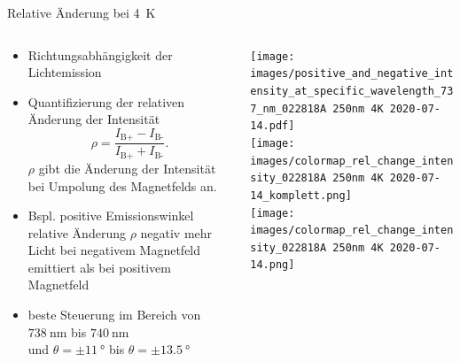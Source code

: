 
\begin{frame}{Relative Änderung bei \SI{4}{\kelvin}}
    \begin{columns}
        \pause
        \begin{column}{0.5\textwidth}
            \begin{itemize}
                \item <2-> Richtungsabhängigkeit der Lichtemission
                \item <3-> Quantifizierung der relativen Änderung der Intensität
                \begin{equation*}
                    \rho = \frac{I_\text{B+} - I_\text{B-} }{ I_\text{B+} + I_\text{B-} }.
                \end{equation*}
                $\rho$ gibt die Änderung der Intensität bei Umpolung des Magnetfelds an.
                \item <6-> Bspl. positive Emissionswinkel \rightarrow relative Änderung $\rho$ negativ 
                \rightarrow mehr Licht bei negativem Magnetfeld emittiert als bei positivem Magnetfeld
                \item <7-> beste Steuerung im Bereich von $\SI{738}{\nano\meter}$ bis $\SI{740}{\nano\meter}$\\
                und $\theta = \pm \SI{11}{\degree}$ bis $\theta = \pm \SI{13,5}{\degree}$
            \end{itemize}
        \end{column}
        \begin{column}{0.5\textwidth}
            \centering 
             {%
            \texttt{[image: images/positive\_and\_negative\_intensity\_at\_specific\_wavelength\_737\_nm\_022818A 250nm 4K 2020-07-14.pdf]}\\[-0.5\baselineskip]%
            }%
             {%
            \texttt{[image: images/colormap\_rel\_change\_intensity\_022818A 250nm 4K 2020-07-14\_komplett.png]}\\[-0.5\baselineskip]%
            }%
             {%
            \texttt{[image: images/colormap\_rel\_change\_intensity\_022818A 250nm 4K 2020-07-14.png]}\\[-0.5\baselineskip]%
            }%
        \end{column}
    \end{columns}
\end{frame}


